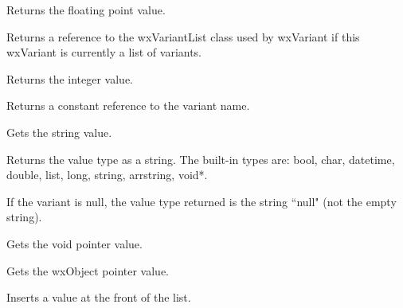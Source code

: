 Returns the floating point value.

\label{wxvariantgetlist}


Returns a reference to the wxVariantList class used by
wxVariant if this wxVariant is currently a list of variants.

\label{wxvariantgetlong}


Returns the integer value.

\label{wxvariantgetname}


Returns a constant reference to the variant name.

\label{wxvariantgetstring}


Gets the string value.

\label{wxvariantgettype}


Returns the value type as a string. The built-in types are: bool, char, datetime, double, list, long, string, arrstring, void*.

If the variant is null, the value type returned is the string ``null" (not the empty string).

\label{wxvariantgetvoidptr}


Gets the void pointer value.

\label{wxvariantgetwxobjectptr}


Gets the wxObject pointer value.

\label{wxvariantinsert}


Inserts a value at the front of the list.

\label{wxvariantisnull}


